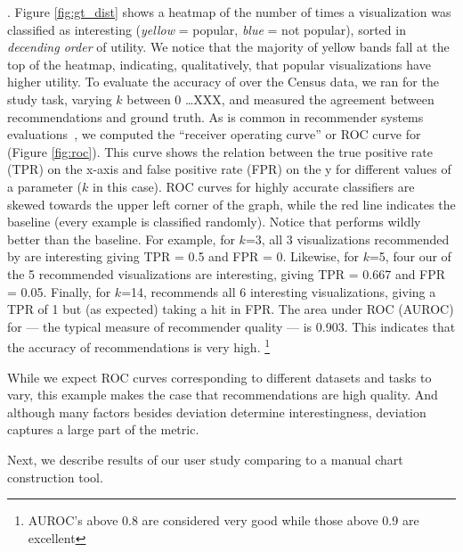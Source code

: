 .
Figure \ref{fig:gt_dist} shows a heatmap of the number of times a
visualization was classified as interesting 
({\em yellow} = popular, {\em blue} = not popular), sorted
in {\em decending order} of utility. 
We notice that the majority of yellow bands fall at the top of the
heatmap, indicating, qualitatively, that popular visualizations have higher utility.
To evaluate the accuracy of \SeeDB over the Census data, 
we ran \SeeDB for the study task, varying $k$ between 0 \ldots XXX, and measured
the agreement between \SeeDB recommendations and ground truth.
As is common in recommender systems evaluations~\cite{rec_sys}, 
we computed the ``receiver operating curve'' or ROC curve for \SeeDB 
(Figure \ref{fig:roc}).
This curve shows the relation between the true positive rate (TPR) on the 
x-axis and false positive rate (FPR) on the y for different values of a
parameter ($k$ in this case).
ROC curves for highly accurate classifiers are skewed towards the upper left
corner of the graph, while the red line indicates the baseline (every example
is classified randomly).
Notice that \SeeDB performs wildly better than the baseline.
For example, for $k$=3, all 3 visualizations recommended by \SeeDB are interesting
giving TPR = 0.5 and FPR = 0.
Likewise, for $k$=5, four our of the 5 recommended visualizations are interesting, 
giving TPR = 0.667 and FPR = 0.05.
Finally, for $k$=14, \SeeDB recommends all 6 interesting visualizations, giving a 
TPR of 1 but (as expected) taking a hit in FPR.
The area under ROC (AUROC) for \SeeDB --- the typical measure of recommender quality ---
is 0.903.
This indicates that the accuracy of \SeeDB recommendations is very high.
\footnote{AUROC's above 0.8 are considered very good while those above 0.9 are
excellent}

While we expect ROC curves corresponding to different datasets and tasks to vary,
this example makes the case that \SeeDB recommendations are high quality.
And although many factors besides deviation determine interestingness, deviation 
captures a large part of the metric.

Next, we describe results of our user study comparing \SeeDB to a manual
chart construction tool.

